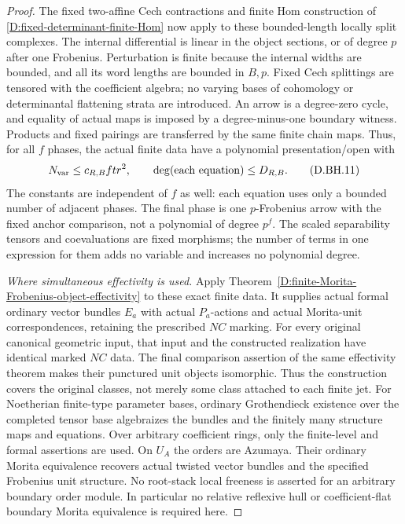 \begin{proof}
The fixed two-affine Cech contractions and finite Hom
construction of
\ref{D:fixed-determinant-finite-Hom}
now apply to these bounded-length locally split complexes.
The internal differential is linear in the object sections,
or of degree $p$ after one Frobenius. Perturbation is finite
because the internal widths are bounded, and all its word
lengths are bounded in $B,p$. Fixed Cech splittings are
tensored with the coefficient algebra; no varying bases
of cohomology or determinantal flattening strata are
introduced. An arrow is a degree-zero cycle, and equality
of actual maps is imposed by a degree-minus-one boundary
witness. Products and fixed pairings are transferred by
the same finite chain maps. Thus, for all $f$ phases, the
actual finite data have a polynomial presentation/open with
\[
  N_{\rm var}\le c_{R,B}ftr^2,\qquad
  \deg(\text{each equation})\le D_{R,B}.               \tag{D.BH.11}
\]
The constants are independent of $f$ as well: each equation
uses only a bounded number of adjacent phases. The final
phase is one $p$-Frobenius arrow with the fixed anchor
comparison, not a polynomial of degree $p^f$.
The scaled separability tensors and coevaluations are
fixed morphisms; the number of terms in one expression
for them adds no variable and increases no polynomial
degree.

\emph{Where simultaneous effectivity is used.}
Apply Theorem~\ref{D:finite-Morita-Frobenius-object-effectivity}
to these exact finite data. It supplies actual formal ordinary vector bundles
$E_a$ with actual $P_a$-actions and actual Morita-unit
correspondences, retaining the prescribed $NC$ marking.
For every original canonical geometric input, that input
and the constructed realization have identical marked
$NC$ data. The final comparison assertion of the same
effectivity theorem makes their punctured unit objects
isomorphic. Thus the construction covers the original
classes, not merely some class attached to each finite jet.
For Noetherian finite-type parameter bases, ordinary
Grothendieck existence over the completed tensor base
algebraizes the bundles and the finitely many structure
maps and equations. Over arbitrary coefficient rings,
only the finite-level and formal assertions are used.
On $U_A$ the orders are Azumaya. Their ordinary Morita
equivalence recovers actual twisted vector bundles and
the specified Frobenius unit structure. No root-stack
local freeness is asserted for an arbitrary boundary
order module. In particular no relative reflexive hull
or coefficient-flat boundary Morita equivalence is
required here.


\end{proof}
